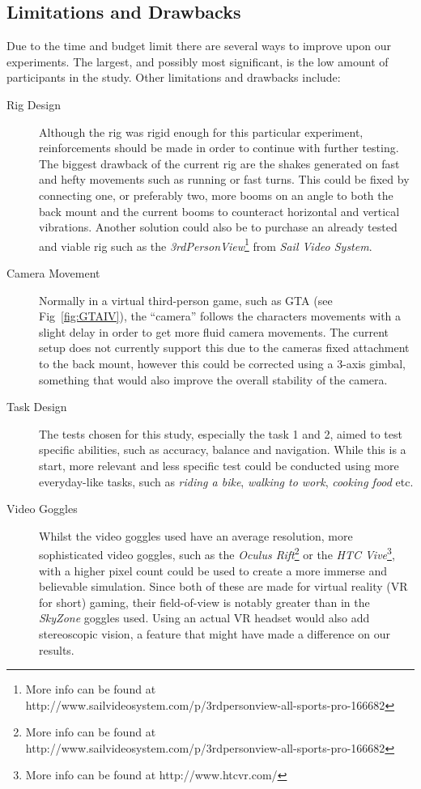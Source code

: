 \documentclass[runningheads,a4paper,oribibl]{llncs}
\begin{document}
\subsection{Limitations and Drawbacks}
Due to the time and budget limit there are several ways to improve upon our experiments. The largest, and possibly most significant, is the low amount of participants in the study. Other limitations and drawbacks include:
\begin{description}
	\item[Rig Design] Although the rig was rigid enough for this particular experiment, reinforcements should be made in order to continue with further testing. The biggest drawback of the current rig are the shakes generated on fast and hefty movements such as running or fast turns. This could be fixed by connecting one, or preferably two, more booms on an angle to both the back mount and the current booms to counteract horizontal and vertical vibrations. Another solution could also be to purchase an already tested and viable rig such as the \emph{3rdPersonView}\footnote{More info can be found at http://www.sailvideosystem.com/p/3rdpersonview-all-sports-pro-166682} from \emph{Sail Video System}.

	\item[Camera Movement] Normally in a virtual third-person game, such as GTA (see Fig~\ref{fig:GTAIV}), the ``camera'' follows the characters movements with a slight delay in order to get more fluid camera movements. The current setup does not currently support this due to the cameras fixed attachment to the back mount, however this could be corrected using a 3-axis gimbal, something that would also improve the overall stability of the camera.

	\item[Task Design] The tests chosen for this study, especially the task 1 and 2, aimed to test specific abilities, such as accuracy, balance and navigation. While this is a start, more relevant and less specific test could be conducted using more everyday-like tasks, such as \emph{riding a bike}, \emph{walking to work}, \emph{cooking food} etc.

	\item[Video Goggles] Whilst the video goggles used have an average resolution, more sophisticated video goggles, such as the \emph{Oculus Rift}\footnote{More info can be found at http://www.sailvideosystem.com/p/3rdpersonview-all-sports-pro-166682} or the \emph{HTC Vive}\footnote{More info can be found at http://www.htcvr.com/}, with a higher pixel count could be used to create a more immerse and believable simulation. Since both of these are made for virtual reality (VR for short) gaming, their field-of-view is notably greater than in the \emph{SkyZone} goggles used. Using an actual VR headset would also add stereoscopic vision, a feature that might have made a difference on our results.


\end{description}
\end{document}
